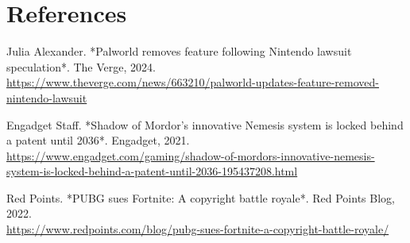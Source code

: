 \documentclass{article}
\begin{document}
\section*{References}

\noindent
\textbf{\cite{Palworld}} Julia Alexander. *Palworld removes feature following Nintendo lawsuit speculation*. The Verge, 2024. \\
\url{https://www.theverge.com/news/663210/palworld-updates-feature-removed-nintendo-lawsuit}

\vspace{0.5em}

\noindent
\textbf{\cite{Nemesis}} Engadget Staff. *Shadow of Mordor’s innovative Nemesis system is locked behind a patent until 2036*. Engadget, 2021. \\
\url{https://www.engadget.com/gaming/shadow-of-mordors-innovative-nemesis-system-is-locked-behind-a-patent-until-2036-195437208.html}

\vspace{0.5em}

\noindent
\textbf{\cite{PUBGvsFortnite}} Red Points. *PUBG sues Fortnite: A copyright battle royale*. Red Points Blog, 2022. \\
\url{https://www.redpoints.com/blog/pubg-sues-fortnite-a-copyright-battle-royale/}
\end{document}
